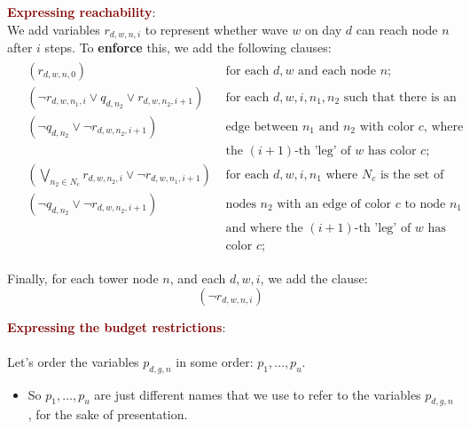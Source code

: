 {\Large \textbf{\textcolor{Maroon}{Expressing reachability}}:} \\
We add variables $r_{d, w, n, i}$ to represent whether wave $w$ on day $d$ can reach node $n$ after $i$ steps. To \textbf{enforce} this, we add the following clauses: 
\begin{equation*}
\begin{aligned}
&\begin{array}{ll}
\left(r_{d, w, n, 0}\right) & \text { for each } d, w \text { and each} \text { node } n ; \\
\left(\neg r_{d, w, n_{1}, i} \vee q_{d, n_{2}} \vee r_{d, w, n_{2}, i+1}\right) & \text { for each } d, w, i, n_{1}, n_{2} \text { such that there is an } \\
\left(\neg q_{d, n_{2}} \vee \neg r_{d, w, n_{2}, i+1}\right) & \text { edge between } n_{1} \text { and } n_{2} \text { with color } c \text {, where } \\
& \text { the }(i+1) \text {-th 'leg' of } w \text { has color } c \text {; } \\
\left(\bigvee_{n_{2} \in N_{c}} r_{d, w, n_{2}, i} \vee \neg r_{d, w, n_{1}, i+1}\right) & \text { for each } d, w, i, n_{1} \text { where } N_{c} \text { is the set of } \\
\left(\neg q_{d, n_{2}} \vee \neg r_{d, w, n_{2}, i+1}\right) & \text { nodes } n_{2} \text { with an edge of color } c \text { to node } n_{1} \\
& \text { and where the }(i+1) \text {-th 'leg' of } w \text { has } \\
& \text { color } c \text {; }
\end{array}
\end{aligned}
\end{equation*}

Finally, for each tower node $n$, and each $d, w, i$, we add the clause: $$\left(\neg r_{d, w, n, i}\right)$$

\vspace{1cm}

{\Large \textbf{\textcolor{Maroon}{Expressing the budget restrictions}}:} \\
\\
Let's order the variables $p_{d, g, n}$ in some order: $p_{1}, \ldots, p_{u}$.
\begin{itemize}
    \item So $p_{1}, \ldots, p_{u}$ are just different names that we use to refer to the variables $p_{d, g, n}$, for the sake of presentation.
\end{itemize}

